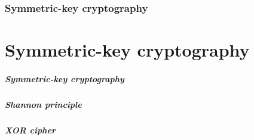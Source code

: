 \section[Section]{Symmetric-key cryptography}
\part{Symmetric-key cryptography}
\begin{frame}
	\partpage
	\centering
\end{frame}

\begin{frame}
  \frametitle{Symmetric-key cryptography}

\end{frame}

\begin{frame}
  \frametitle{Shannon principle}

\end{frame}

\begin{frame}
  \frametitle{XOR cipher}

\end{frame}
